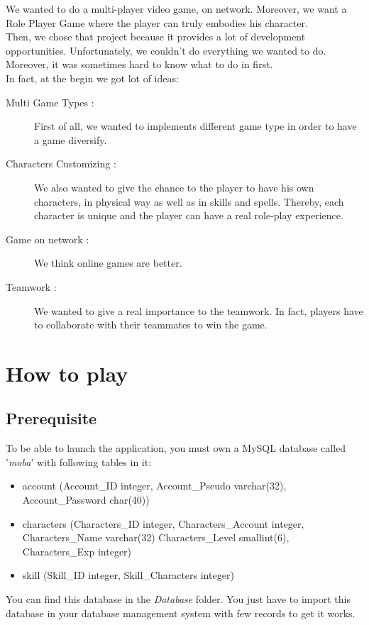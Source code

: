 \documentclass{scrreprt}
\begin{document}
		  We wanted to do a multi-player video game, on network. Moreover, we want a Role Player Game where the player can truly embodies his character.\\

		  Then, we chose that project because it provides a lot of development opportunities. Unfortunately, we couldn't do everything we wanted to do. Moreover, it was sometimes hard to know what to do in first.\\

		  In fact, at the begin we got lot of ideas:
		  \begin{description}
		  \item[Multi Game Types :]{ First of all, we wanted to implements different game type in order to have a game diversify.}
		  \item[Characters Customizing :] {We also wanted to give the chance to the player to have his own characters, in physical way as well as in skills and spells. Thereby, each character is unique and the player can have a real role-play experience.}
		  \item[Game on network :] {We think online games are better.}
		  \item[Teamwork :] {We wanted to give a real importance to the teamwork. In fact, players have to collaborate with their teammates to win the game.}
		  \end{description}
		  \part{How to play}
		  \chapter{Prerequisite}
		  To be able to launch the application, you must own a MySQL database called '\emph{moba}' with following tables in it:
		  \begin{itemize}
		  \item{account (Account\_ID integer, Account\_Pseudo varchar(32), Account\_Password char(40))}
		  \item{characters (Characters\_ID integer, Characters\_Account integer, Characters\_Name varchar(32) Characters\_Level smallint(6), Characters\_Exp integer)}
		  \item{skill (Skill\_ID integer, Skill\_Characters integer)}
		  \end{itemize}
		
		  You can find this database in the \emph{Database} folder. You just have to import this database in your database management system with few records to get it works.\\
\end{document}
